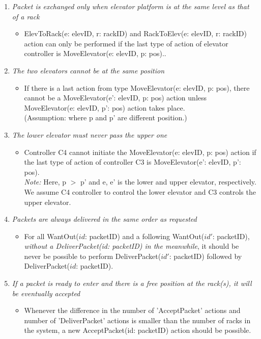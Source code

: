 \begin{enumerate}
\item \textit{Packet is exchanged only when elevator platform is at the same level as that of a rack}
	\begin{itemize}
	\item ElevToRack(e: elevID, r: rackID) and RackToElev(e: elevID, r: rackID) action can only be performed if the last type of action of elevator controller is MoveElevator(e: elevID, p: pos)..
	\end{itemize}
	
\item \textit{The two elevators cannot be at the same position}
	\begin{itemize}
	\item If there is a last action from type MoveElevator(e: elevID, p: pos),
	there cannot be a MoveElevator(e': elevID, p: pos) action unless 
	MoveElevator(e: elevID, p': pos) action takes place.\\(Assumption: where p and p' are different position.)

	\end{itemize}
		
\item \textit{The lower elevator must never pass the upper one}
	\begin{itemize}
	\item Controller C4 cannot initiate the MoveElevator(e: elevID, p: pos) 
	action if the last type of action of controller C3 is MoveElevator(e': elevID, p': pos).\\
	\textit{Note:} Here, p $>$ p' and e, e' is the lower and 
	upper elevator, respectively. We assume C4 controller to control
	the lower elevator and C3 controls the upper elevator.
	\end{itemize}
	
\item \textit{Packets are always delivered in the same order as
	requested}	
	\begin{itemize}
	\item 
	For all WantOut($id$: packetID) and a following WantOut($id'$: 
	packetID), \textit{without a DeliverPacket(id: packetID) in the meanwhile}, it
	should be never be possible to perform DeliverPacket($id'$: 
	packetID) followed by DeliverPacket($id$: packetID).
	\end{itemize}
	
\item \textit{If a packet is ready to enter and there is a free
	position at the rack(s), it will be eventually accepted}
	\begin{itemize}
	\item Whenever the difference in the number of 'AcceptPacket'
	actions and number of 'DeliverPacket' actions is  smaller than the
	number of racks in the system, a new AcceptPacket(id: packetID)
	action should be possible.
	\end{itemize}
	

\end{enumerate}
